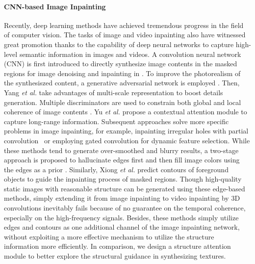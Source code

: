 \paragraph{CNN-based Image Inpainting}
Recently, deep learning methods have achieved tremendous progress in the field
of computer vision. The tasks of image and video inpainting also have witnessed great promotion thanks to the capability of deep neural networks to capture high-level semantic information in images and videos.
%
A convolution neural network (CNN) is first introduced to directly synthesize image contents in the masked regions for image denoising and inpainting in \cite{xie2012image}.
To improve the photorealism of the synthesiszed content, a generative adversarial network is employed \cite{pathak2016context}. 
Then, Yang \emph{et al.} \cite{yang2017high} take advantages of multi-scale representation to boost details generation.
Multiple discriminators are used to constrain both global and local coherence of image contents \cite{iizuka2017globally}.  
Yu \emph{et al.} \cite{yu2018generative} propose a contextual attention module to capture long-range information.
Subsequent approaches solve more specific problems in image inpainting, for example, inpainting irregular holes with partial convolution~\cite{liu2018partialinpainting} or employing gated convolution \cite{yu2018free} for dynamic feature selection. 
%
While these methods tend to generate over-smoothed and blurry results, a two-stage approach is proposed to hallucinate edges first and then fill image colors using the edges as a prior \cite{nazeri2019edgeconnect}. 
Similarly, Xiong \emph{et al.} \cite{Xiong_2019_CVPR} predict contours of foreground objects to guide the inpainting process of masked regions.
Though high-quality static images with reasonable structure can be generated using these edge-based methods, simply extending it from image inpainting to video inpainting by 3D convolutions inevitably fails because of no guarantee on the temporal coherence, especially on the high-frequency signals. 
Besides, these methods simply utilize edges and contours as one additional channel of the image inpainting network, without exploiting a more effective mechanism to utilize the structure information more efficiently. 
In comparison, we design a structure attention module to better explore the structural guidance in synthesizing textures. 



